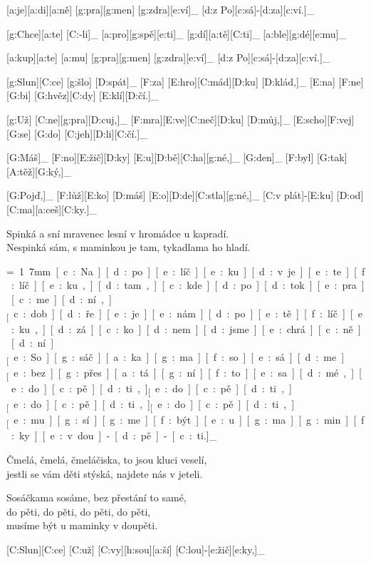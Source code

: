 [a:je][a:di][a:ně] [g:pra][g:men] [g:zdra][e:ví]_
[d:z Po][c:sá]-[d:za][c:ví.]_

[g:Chce][a:te] [C:-li]_ [a:pro][g:spě][e:ti]_
[g:dí][a:tě][C:ti]_ [a:ble][g:dé][e:mu]_

[a:kup][a:te] [a:mu] [g:pra][g:men] [g:zdra][e:ví]_
[d:z Po][c:sá]-[d:za][c:ví.]_



[g:Slun][C:ce] [g:šlo] [D:spát]_ [F:za] [E:hro][C:mád][D:ku] [D:klád,]_
[E:na] [F:ne][G:bi] [G:hvěz][C:dy] [E:klí][D:čí.]_

[g:Už] [C:ne][g:pra][D:cuj,]_ [F:mra][E:ve][C:neč][D:ku] [D:můj,]_
[E:scho][F:vej] [G:se] [G:do] [C:jeh][D:li][C:čí.]_

[G:Máš]_ [F:no][E:žič][D:ky] [E:u][D:bě][C:ha][g:né,]_
[G:den]_ [F:byl] [G:tak] [A:těž][G:ký,]_

[G:Pojď,]_ [F:lůž][E:ko] [D:máš] [E:o][D:de][C:stla][g:né,]_
[C:v plát]-[E:ku] [D:od] [C:ma][a:ceš][C:ky.]_

Spinká a sní mravenec lesní
v hromádce u kapradí. \\
Nespinká sám, s maminkou je tam,
tykadlama ho hladí.



{\unit=1.7mm
[c:Na] [d:po][e:líč][e:ku] [d:v je][e:te][f:líč][e:ku,] %
[d:tam,] [c:kde] [d:po][d:tok] [e:pra][c:me][d:ní,]_

[c:dob][d:ře] [e:je] [e:nám] [d:po] [e:tě][f:líč][e:ku,] %
[d:zá][c:ko][d:nem] [d:jsme] [e:chrá][c:ně][d:ní.]_

[e:So][g:sáč][a:ka][g:ma] [f:so][e:sá][d:me]_
[e:bez] [g:přes][a:tá][g:ní] [f:to] [e:sa][d:mé,]_

\unit
[e:do] [c:pě][d:ti,]_
[e:do] [c:pě][d:ti,]_
[e:do] [c:pě][d:ti,]_
[e:do] [c:pě][d:ti,]_

[e:mu][g:sí][g:me] [f:být] [e:u] [g:ma][g:min][f:ky] %
[e:v dou]-[d:pě]-[c:ti.]_
}

Čmelá, čmelá, čmeláčiska,
to jsou kluci veselí,\\
jestli se vám děti stýská,
najdete nás v jeteli.

Sosáčkama sosáme,
bez přestání to samé,\\
do pěti, do pěti,
do pěti, do pěti,\\
musíme být u maminky v doupěti.



[C:Slun][C:ce] [C:už] [C:vy][h:sou][a:ší] [C:lou]-[e:žič][e:ky,]_


